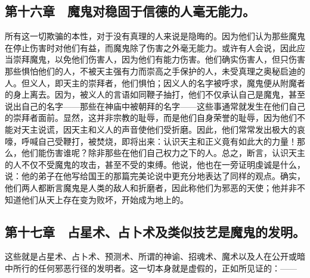 
\subsection{第十六章　魔鬼对稳固于信德的人毫无能力。}

所有这一切欺骗的本性，对于没有真理的人来说是隐晦的。因为他们认为那些魔鬼在停止伤害时对他们有益，而魔鬼除了伤害之外毫无能力。或许有人会说，因此应当崇拜魔鬼，以免他们伤害人，因为他们有能力伤害。他们确实伤害人，但只伤害那些惧怕他们的人，不被天主强有力而崇高之手保护的人，未受真理之奥秘启迪的人。但义人，即天主的崇拜者，他们惧怕；因义人的名字被呼求，魔鬼便从附魔者的身上离去。因为，被义人的言语如同鞭子抽打，他们不仅承认自己是魔鬼，甚至说出自己的名字——那些在神庙中被朝拜的名字——这些事通常就发生在他们自己的崇拜者面前。显然，这并非宗教的耻辱，而是他们自身荣誉的耻辱，因为他们不能对天主说谎，因天主和义人的声音使他们受折磨。因此，他们常常发出极大的哀嚎，呼喊自己受鞭打，被焚烧，即将出来：认识天主和正义竟有如此大的力量！那么，他们能伤害谁呢？除非那些在他们自己权力之下的人。总之，断言，认识天主的人不仅不受魔鬼的攻击，甚至不受的束缚。他说，他也在一旁证明虔诚是什么，说：他的弟子在他写给国王的那篇完美论说中更充分地表达了同样的观点。确实，他们两人都断言魔鬼是人类的敌人和折磨者，因此称他们为邪恶的天使；他并非不知道他们从天上存在变为败坏，开始成为地上的。\par


\subsection{第十七章　占星术、占卜术及类似技艺是魔鬼的发明。}

这些就是占星术、占卜术、预测术、所谓的神谕、招魂术、魔术以及人在公开或暗中所行的任何邪恶行径的发明者。这一切本身就是虚假的，正如所见证的：——\par

\par

